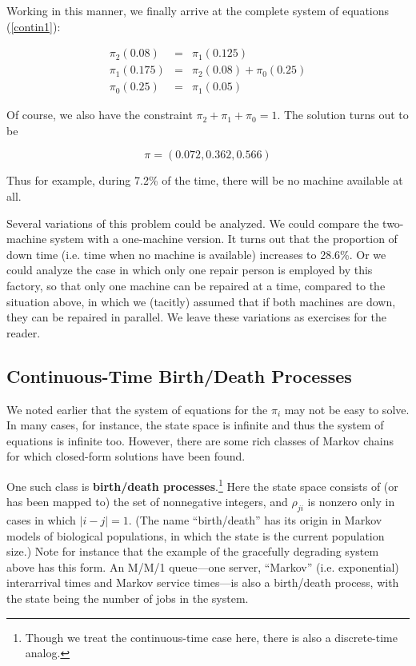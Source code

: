 \documentclass[11pt]{article}
\begin{document}
Working in this manner, we finally arrive at the complete system of equations
(\ref{contin1}):

\begin{eqnarray}
\pi_{2}(0.08) & = & \pi_{1}(0.125)\\
\pi_{1}(0.175) & = & \pi_{2}(0.08)+\pi_{0}(0.25)\\
\pi_{0}(0.25) & = & \pi_{1}(0.05)
\end{eqnarray} 

Of course, we also have the constraint $\pi_{2}+\pi_{1}+\pi_{0}=1$.
The solution turns out to be

\begin{equation}
\pi =(0.072,0.362,0.566)
\end{equation}  

Thus for example, during 7.2\% of the time, there will be no machine available
at all.

Several variations of this problem could be analyzed. We could compare
the two-machine system with a one-machine version. It turns out that the
proportion of down time (i.e. time when no machine is available)
increases to 28.6\%. Or we could analyze the case in which only one
repair person is employed by this factory, so that only one machine can
be repaired at a time, compared to the situation above, in which we
(tacitly) assumed that if both machines are down, they can be repaired
in parallel. We leave these variations as exercises for the reader.

\subsection{Continuous-Time Birth/Death Processes}

We noted earlier that the system of equations for the $\pi_i$ may not be
easy to solve. In many cases, for instance, the state space is infinite
and thus the system of equations is infinite too. However, there are
some rich classes of Markov chains for which closed-form solutions have
been found.

One such class is \textbf{birth/death processes}.\footnote{Though we
treat the continuous-time case here, there is also a discrete-time
analog.} Here the state space consists of (or has been mapped to) the
set of nonnegative integers, and $\rho_{ji}$ is nonzero only in cases in
which $|i-j| = 1$. (The name ``birth/death'' has its origin in Markov
models of biological populations, in which the state is the current
population size.) Note for instance that the example of the gracefully
degrading system above has this form. An M/M/1 queue---one server,
``Markov'' (i.e.  exponential) interarrival times and Markov service
times---is also a birth/death process, with the state being the number
of jobs in the system.
\end{document}
